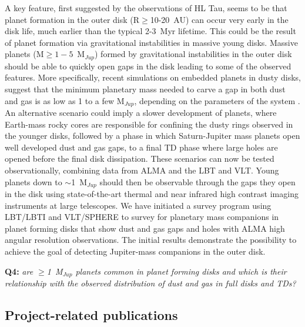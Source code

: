 \documentclass[10pt,fleqn,twoside]{article}
\begin{document}
A key feature, first suggested by the observations of HL Tau, seems to be that planet formation in the outer disk (R$\ge$10-20~AU) can occur very early in the disk life, much earlier than the typical 2-3~Myr lifetime. This could be the result of planet formation via gravitational instabilities in massive young disks. Massive planets (M$\ge 1-5$~M$_{Jup}$) formed by gravitational instabilities in the outer disk should be able to quickly open gaps in the disk leading to some of the observed features. More specifically, recent simulations on embedded planets in dusty disks, suggest that the minimum planetary mass needed to carve a gap in both dust and gas is as low as 1 to a few M$_{Jup}$, depending on the parameters of the system \citep{2016MNRAS.459L...1D}. An alternative scenario could imply a slower development of planets, where Earth-mass rocky cores are responsible for confining the dusty rings observed in the younger disks, followed by a phase in which Saturn-Jupiter mass planets open well developed dust and gas gaps, to a final TD phase where large holes are opened before the final disk dissipation.
These scenarios can now be tested observationally, combining data from ALMA and the LBT and VLT.
Young planets down to $\sim$1~M$_{Jup}$ should then be observable through the gaps they open in the disk using state-of-the-art thermal and near infrared high contrast imaging instruments at large telescopes. We have initiated a survey program using LBT/LBTI and VLT/SPHERE to survey for planetary mass companions in planet forming disks that show dust and gas gaps and holes with ALMA high angular resolution observations. The initial results demonstrate the possibility to achieve the goal of detecting Jupiter-mass companions in the outer disk.

\smallskip
{\bf Q4:} {\it are $\ge$1~M$_{Jup}$ planets common in planet forming disks and which is their relationship with the observed distribution of dust and gas in full disks and TDs?}

\subsection{Project-related publications}

\end{document}
